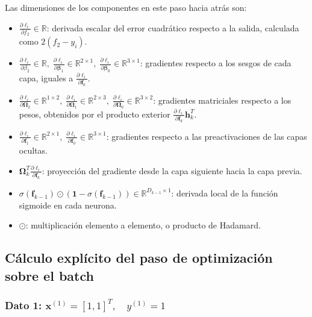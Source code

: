 \documentclass[10pt,a4paper]{article}
\begin{document}
Las dimensiones de los componentes en este paso hacia atrás son:
\begin{itemize}
    \item $\frac{\partial \ell_i}{\partial f_2} \in \mathbb{R}$: derivada escalar del error cuadrático respecto a la salida, calculada como $2(f_2 - y_i)$.
    \item $\frac{\partial \ell_i}{\partial \beta_2} \in \mathbb{R}, \; \frac{\partial \ell_i}{\partial \boldsymbol{\beta}_1} \in \mathbb{R}^{2 \times 1}, \; \frac{\partial \ell_i}{\partial \boldsymbol{\beta}_0} \in \mathbb{R}^{3 \times 1}$: gradientes respecto a los sesgos de cada capa, iguales a $\frac{\partial \ell_i}{\partial \mathbf{f}_k}$.
    \item $\frac{\partial \ell_i}{\partial \boldsymbol{\Omega}_2} \in \mathbb{R}^{1 \times 2}, \; \frac{\partial \ell_i}{\partial \boldsymbol{\Omega}_1} \in \mathbb{R}^{2 \times 3}, \; \frac{\partial \ell_i}{\partial \boldsymbol{\Omega}_0} \in \mathbb{R}^{3 \times 2}$: gradientes matriciales respecto a los pesos, obtenidos por el producto exterior $\frac{\partial \ell_i}{\partial \mathbf{f}_k} \mathbf{h}_k^T$.
    \item $\frac{\partial \ell_i}{\partial \mathbf{f}_1} \in \mathbb{R}^{2 \times 1}, \; \frac{\partial \ell_i}{\partial \mathbf{f}_0} \in \mathbb{R}^{3 \times 1}$: gradientes respecto a las preactivaciones de las capas ocultas.
    \item $\boldsymbol{\Omega}_k^T \frac{\partial \ell_i}{\partial \mathbf{f}_k}$: proyección del gradiente desde la capa siguiente hacia la capa previa.
    \item $\sigma(\mathbf{f}_{k-1}) \odot (\mathbf{1} - \sigma(\mathbf{f}_{k-1})) \in \mathbb{R}^{D_{k-1} \times 1}$: derivada local de la función sigmoide en cada neurona.
    \item $\odot$: multiplicación elemento a elemento, o producto de Hadamard.
\end{itemize}

\subsection*{Cálculo explícito del paso de optimización sobre el batch}

\subsubsection*{Dato 1: $\mathbf{x}^{(1)} = [1, 1]^T, \quad y^{(1)} = 1$}
\end{document}
